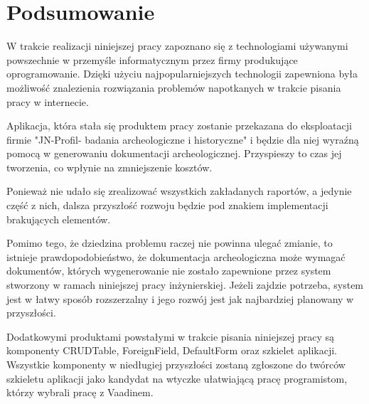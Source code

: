 \chapter{Podsumowanie}
W trakcie realizacji niniejszej pracy zapoznano się z technologiami używanymi powszechnie w przemyśle informatycznym przez firmy produkujące oprogramowanie. Dzięki użyciu najpopularniejszych technologii zapewniona była możliwość znalezienia rozwiązania problemów napotkanych w trakcie pisania pracy w internecie.

Aplikacja, która stała się produktem pracy zostanie przekazana do eksploatacji firmie "JN-Profil- badania archeologiczne i historyczne" i będzie dla niej wyraźną pomocą w generowaniu dokumentacji archeologicznej. Przyspieszy to czas jej tworzenia, co wpłynie na zmniejszenie kosztów. 

Ponieważ nie udało się zrealizować wszystkich zakładanych raportów, a jedynie część z nich, dalsza przyszłość rozwoju będzie pod znakiem implementacji brakujących elementów.

Pomimo tego, że dziedzina problemu raczej nie powinna ulegać zmianie, to istnieje prawdopodobieństwo, że dokumentacja archeologiczna może wymagać dokumentów, których wygenerowanie nie zostało zapewnione przez system stworzony w ramach niniejszej pracy inżynierskiej. Jeżeli zajdzie potrzeba, system jest w łatwy sposób rozszerzalny i jego rozwój jest jak najbardziej planowany w przyszłości.

Dodatkowymi produktami powstałymi w trakcie pisania niniejszej pracy są komponenty CRUDTable, ForeignField, DefaultForm oraz szkielet aplikacji. Wszystkie komponenty w niedługiej przyszłości zostaną zgłoszone do twórców szkieletu aplikacji jako kandydat na wtyczke ułatwiającą pracę programistom, którzy wybrali pracę z Vaadinem.
